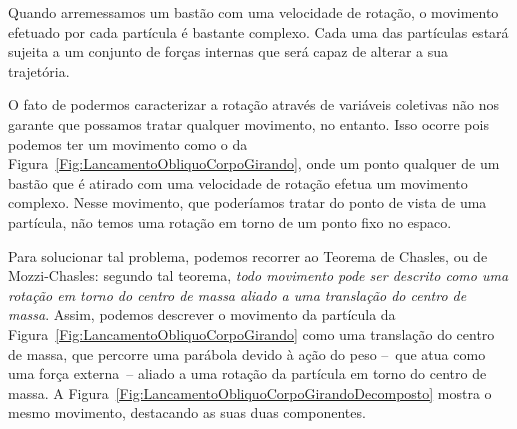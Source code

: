\begin{marginfigure}
\centering
{}
\caption{Quando arremessamos um bastão com uma velocidade de rotação, o movimento efetuado por cada partícula é bastante complexo. Cada uma das partículas estará sujeita a um conjunto de forças internas que será capaz de alterar a sua trajetória. \label{Fig:LancamentoObliquoCorpoGirando}}
\end{marginfigure}

O fato de podermos caracterizar a rotação através de variáveis coletivas não nos garante que possamos tratar qualquer movimento, no entanto. Isso ocorre pois podemos ter um movimento como o da Figura~\ref{Fig:LancamentoObliquoCorpoGirando}, onde um ponto qualquer de um bastão que é atirado com uma velocidade de rotação efetua um movimento complexo. Nesse movimento, que poderíamos tratar do ponto de vista de uma partícula, não temos uma rotação em torno de um ponto fixo no espaco.

Para solucionar tal problema, podemos recorrer ao Teorema de Chasles, ou de Mozzi-Chasles: segundo tal teorema, \emph{todo movimento pode ser descrito como uma rotação em torno do centro de massa aliado a uma translação do centro de massa}. Assim, podemos descrever o movimento da partícula da Figura~\ref{Fig:LancamentoObliquoCorpoGirando} como uma translação do centro de massa, que percorre uma parábola devido à ação do peso --~que atua como uma força externa~-- aliado a uma rotação da partícula em torno do centro de massa. A Figura~\ref{Fig:LancamentoObliquoCorpoGirandoDecomposto} mostra o mesmo movimento, destacando as suas duas componentes.


